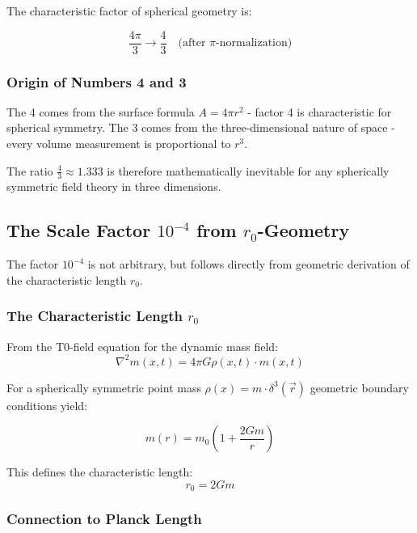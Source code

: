 \documentclass[12pt,a4paper]{report}
\begin{document}
	The characteristic factor of spherical geometry is:
	
	\begin{equation}
		\frac{4\pi}{3} \rightarrow \frac{4}{3} \quad \text{(after $\pi$-normalization)}
	\end{equation}
	
	\subsubsection{Origin of Numbers 4 and 3}
	
	The 4 comes from the surface formula $A = 4\pi r^2$ - factor 4 is characteristic for spherical symmetry. The 3 comes from the three-dimensional nature of space - every volume measurement is proportional to $r^3$.
	
	The ratio $\frac{4}{3} \approx 1.333$ is therefore mathematically inevitable for any spherically symmetric field theory in three dimensions.
	
	\subsection{The Scale Factor $10^{-4}$ from $r_0$-Geometry}
	
	The factor $10^{-4}$ is not arbitrary, but follows directly from geometric derivation of the characteristic length $r_0$.
	
	\subsubsection{The Characteristic Length $r_0$}
	
	From the T0-field equation for the dynamic mass field:
	\begin{equation}
		\nabla^2 m(x,t) = 4\pi G \rho(x,t) \cdot m(x,t)
	\end{equation}
	
	For a spherically symmetric point mass $\rho(x) = m \cdot \delta^3(\vec{r})$ geometric boundary conditions yield:
	
	\begin{equation}
		m(r) = m_0\left(1 + \frac{2Gm}{r}\right)
	\end{equation}
	
	This defines the characteristic length:
	\begin{equation}
		r_0 = 2Gm
	\end{equation}
	
	\subsubsection{Connection to Planck Length}
	
\end{document}
